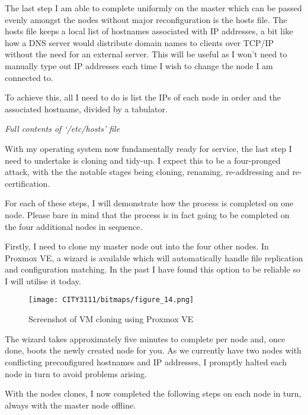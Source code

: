 The last step I am able to complete uniformly on the master which can be passed evenly amongst the nodes without major reconfiguration is the hosts file. The hosts file keeps a local list of hostnames associated with IP addresses, a bit like how a DNS server would distribute domain names to clients over TCP/IP without the need for an external server. This will be useful as I won't need to manually type out IP addresses each time I wish to change the node I am connected to.

To achieve this, all I need to do is list the IPs of each node in order and the associated hostname, divided by a tabulator.


\begin{center}
    \emph{Full contents of `/etc/hosts' file}
\end{center}

\textbf{}

With my operating system now fundamentally ready for service, the last step I need to undertake is cloning and tidy-up. I expect this to be a four-pronged attack, with the the notable stages being cloning, renaming, re-addressing and re-certification.

For each of these steps, I will demonstrate how the process is completed on one node. Please bare in mind that the process is in fact going to be completed on the four additional nodes in sequence.

Firstly, I need to clone my master node out into the four other nodes. In Proxmox VE, a wizard is available which will automatically handle file replication and configuration matching. In the past I have found this option to be reliable so I will utilise it today.
\vfill\break

\begin{figure}[H]
    \texttt{[image: CITY3111/bitmaps/figure\_14.png]}
    \caption{Screenshot of VM cloning using Proxmox VE}
    \label{figure_14}
\end{figure}

The wizard takes approximately five minutes to complete per node and, once done, boots the newly created node for you. As we currently have two nodes with conflicting preconfigured hostnames and IP addresses, I promptly halted each node in turn to avoid problems arising.

With the nodes clones, I now completed the following steps on each node in turn, always with the master node offline.

